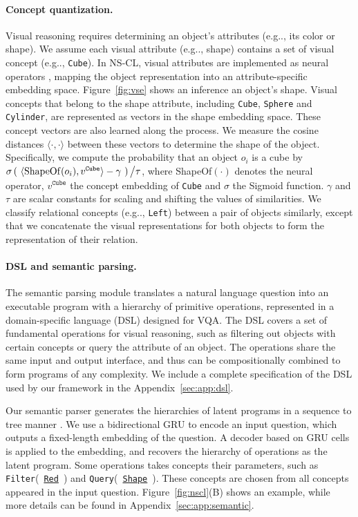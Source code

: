 \documentclass{article} %
\makeatletter
\newcommand{\sigmoid}{\sigma}
\newcommand{\fig}[1]{Figure~\ref{#1}}
\DeclareRobustCommand\onedot{\futurelet\@let@token\@onedot}
\def\@onedot{\ifx\@let@token.\else.\null\fi\xspace}
\def\eg{e.g\onedot} \def\Eg{E.g\onedot}
\newcommand{\model}{NS-CL\xspace}
\newcommand{\myparagraph}[1]{\vspace{-3pt}\paragraph{#1}}
\makeatother
\begin{document}
\myparagraph{Concept quantization.}
Visual reasoning requires determining an object's attributes (\eg, its color or shape). We assume each visual attribute (\eg, shape) contains a set of visual concept (\eg, \texttt{Cube}). In \model, visual attributes are implemented as neural operators
%
, mapping the object representation into an attribute-specific embedding space. \fig{fig:vse} shows an inference an object's shape. Visual concepts that belong to the shape attribute, including \texttt{Cube}, \texttt{Sphere} and \texttt{Cylinder}, are represented as vectors in the shape embedding space. These concept vectors are also learned along the process. We measure the cosine distances $\langle \cdot , \cdot \rangle$ between these vectors to determine the shape of the object. Specifically, we compute the probability that an object $o_i$ is a cube by
%
$\sigmoid \left({~\langle \mathrm{\small ShapeOf}(o_i), v^{\texttt{Cube}} \rangle - \gamma}~\right) \big/ \tau$,
%
%
where ShapeOf$(\cdot)$ denotes the neural operator, $v^{\texttt{Cube}}$ the concept embedding of \texttt{Cube} and $\sigmoid$ the Sigmoid function. $\gamma$ and $\tau$ are scalar constants for scaling and shifting the values of similarities. We classify relational concepts (\eg, \texttt{Left}) between a pair of objects similarly, except that we concatenate the visual representations for both objects to form the representation of their relation.

\myparagraph{DSL and semantic parsing.}

The semantic parsing module translates a natural language question into an executable program with a hierarchy of primitive operations, represented in a domain-specific language (DSL) designed for VQA. The DSL covers a set of fundamental operations for visual reasoning, such as filtering out objects with certain concepts or query the attribute of an object. The operations share the same input and output interface, and thus can be compositionally combined to form programs of any complexity. We include a complete specification of the DSL used by our framework in the Appendix~\ref{sec:app:dsl}.

Our semantic parser generates the hierarchies of latent programs in a sequence to tree manner \citep{Dong2016Language}. We use a bidirectional GRU \citep{Cho2014Learning} to encode an input question, which outputs a fixed-length embedding of the question. A decoder based on GRU cells is applied to the embedding, and recovers the hierarchy of operations as the latent program. Some operations takes concepts their parameters, such as \texttt{Filter}(~\underline{\texttt{Red}}~) and \texttt{Query}(~\underline{\texttt{Shape}}~). These concepts are chosen from all concepts appeared in the input question. \fig{fig:nscl}(B) shows an example, while more details can be found in Appendix~\ref{sec:app:semantic}.
\end{document}
